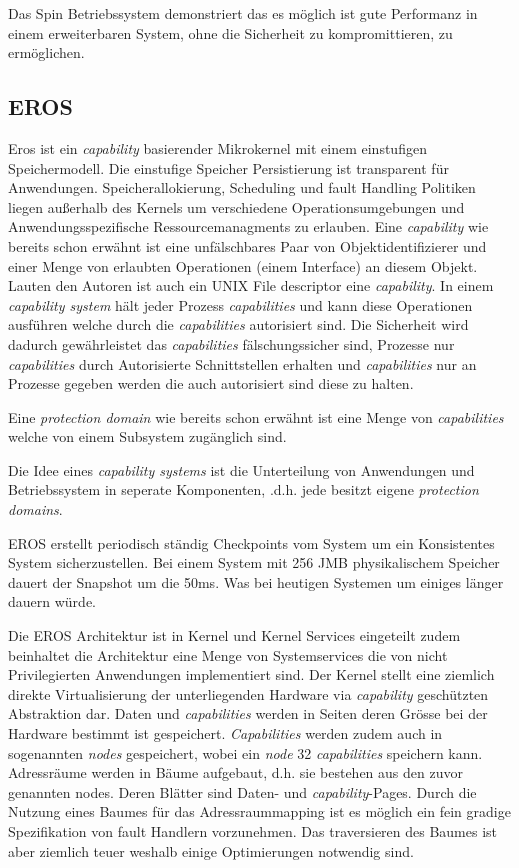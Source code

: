 \documentclass[9pt,technote]{IEEEtran}
\begin{document}
      Das Spin Betriebssystem demonstriert das es m\"oglich ist gute Performanz in einem erweiterbaren System, ohne die Sicherheit zu kompromittieren, zu erm\"oglichen.
    \subsection{EROS}      
        Eros ist ein \textit{capability} basierender Mikrokernel mit einem einstufigen Speichermodell. Die einstufige Speicher Persistierung ist transparent f\"ur Anwendungen.
        Speicherallokierung, Scheduling und fault Handling Politiken liegen au\ss erhalb des Kernels um verschiedene Operationsumgebungen und Anwendungsspezifische Ressourcemanagments zu erlauben.
        Eine \textit{capability} wie bereits schon erw\"ahnt ist eine unf\"alschbares Paar von Objektidentifizierer und einer Menge von erlaubten Operationen (einem Interface) an diesem Objekt.
        Lauten den Autoren ist auch ein UNIX File descriptor eine \textit{capability}. In einem \textit{capability system} h\"alt jeder Prozess \textit{capabilities} und kann diese Operationen ausf\"uhren
        welche durch die \textit{capabilities} autorisiert sind. Die Sicherheit wird dadurch gew\"ahrleistet das \textit{capabilities} f\"alschungssicher sind, Prozesse nur \textit{capabilities} durch
        Autorisierte Schnittstellen erhalten und \textit{capabilities} nur an Prozesse gegeben werden die auch autorisiert sind diese zu halten.
        
        Eine \textit{protection domain} wie bereits schon erw\"ahnt ist eine Menge von \textit{capabilities} welche von einem Subsystem zug\"anglich sind.
        
        Die Idee eines \textit{capability systems} ist die Unterteilung von Anwendungen und Betriebssystem in seperate Komponenten, .d.h. jede besitzt eigene \textit{protection domains}.
        
        EROS erstellt periodisch st\"andig Checkpoints vom System um ein Konsistentes System sicherzustellen. Bei einem System mit 256 JMB physikalischem Speicher dauert der Snapshot um die
        50ms. Was bei heutigen Systemen um einiges l\"anger dauern w\"urde.

        Die EROS Architektur ist in Kernel und Kernel Services eingeteilt zudem beinhaltet die Architektur eine Menge von Systemservices die von nicht Privilegierten Anwendungen implementiert sind.
        Der Kernel stellt eine ziemlich direkte Virtualisierung der unterliegenden Hardware via \textit{capability} gesch\"utzten Abstraktion dar.
        Daten und \textit{capabilities } werden in Seiten deren Gr\"osse bei der Hardware bestimmt ist gespeichert. \textit{Capabilities} werden zudem auch in sogenannten \textit{nodes} gespeichert,
        wobei ein \textit{node} 32 \textit{capabilities} speichern kann. Adressr\"aume werden in B\"aume aufgebaut, d.h. sie bestehen aus den zuvor genannten nodes. Deren Bl\"atter
        sind Daten- und \textit{capability}-Pages. Durch die Nutzung eines Baumes f\"ur das Adressraummapping ist es m\"oglich ein fein gradige Spezifikation von fault Handlern vorzunehmen.
        Das traversieren des Baumes ist aber ziemlich teuer weshalb einige Optimierungen notwendig sind. 
        
\end{document}
